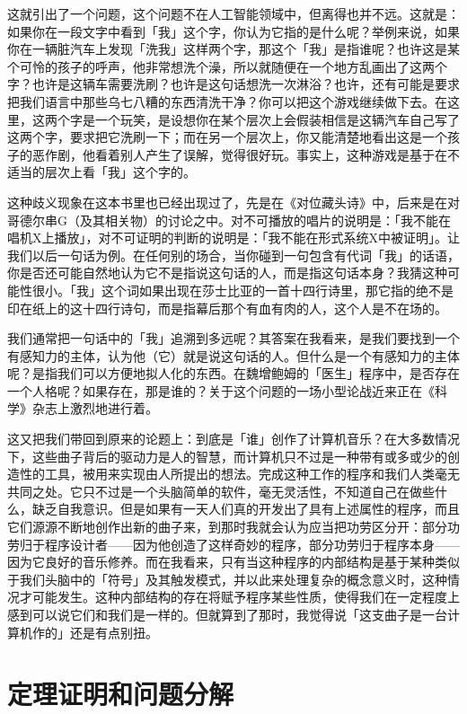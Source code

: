 \documentclass[
  12pt,
  twoside,
  openright,
  oldfontcommands,
]{memoir}
\begin{document}
这就引出了一个问题，这个问题不在人工智能领域中，但离得也并不远。这就是：如果你在一段文字中看到「我」这个字，你认为它指的是什么呢？举例来说，如果你在一辆脏汽车上发现「洗我」这样两个字，那这个「我」是指谁呢？也许这是某个可怜的孩子的呼声，他非常想洗个澡，所以就随便在一个地方乱画出了这两个字？也许是这辆车需要洗刷？也许是这句话想洗一次淋浴？也许，还有可能是要求把我们语言中那些乌七八糟的东西清洗干净？你可以把这个游戏继续做下去。在这里，这两个字是一个玩笑，是设想你在某个层次上会假装相信是这辆汽车自己写了这两个字，要求把它洗刷一下；而在另一个层次上，你又能清楚地看出这是一个孩子的恶作剧，他看着别人产生了误解，觉得很好玩。事实上，这种游戏是基于在不适当的层次上看「我」这个字的。

这种歧义现象在这本书里也已经出现过了，先是在《对位藏头诗》中，后来是在对哥德尔串G（及其相关物）的讨论之中。对不可播放的唱片的说明是：「我不能在唱机X上播放」，对不可证明的判断的说明是：「我不能在形式系统X中被证明」。让我们以后一句话为例。在任何别的场合，当你碰到一句包含有代词「我」的话语，你是否还可能自然地认为它不是指说这句话的人，而是指这句话本身？我猜这种可能性很小。「我」这个词如果出现在莎士比亚的一首十四行诗里，那它指的绝不是印在纸上的这十四行诗句，而是指幕后那个有血有肉的人，这个人是不在场的。

我们通常把一句话中的「我」追溯到多远呢？其答案在我看来，是我们要找到一个有感知力的主体，认为他（它）就是说这句话的人。但什么是一个有感知力的主体呢？是指我们可以方便地拟人化的东西。在魏增鲍姆的「医生」程序中，是否存在一个人格呢？如果存在，那是谁的？关于这个问题的一场小型论战近来正在《科学》杂志上激烈地进行着。

这又把我们带回到原来的论题上：到底是「谁」创作了计算机音乐？在大多数情况下，这些曲子背后的驱动力是人的智慧，而计算机只不过是一种带有或多或少的创造性的工具，被用来实现由人所提出的想法。完成这种工作的程序和我们人类毫无共同之处。它只不过是一个头脑简单的软件，毫无灵活性，不知道自己在做些什么，缺乏自我意识。但是如果有一天人们真的开发出了具有上述属性的程序，而且它们源源不断地创作出新的曲子来，到那时我就会认为应当把功劳区分开：部分功劳归于程序设计者------因为他创造了这样奇妙的程序，部分功劳归于程序本身------因为它良好的音乐修养。而在我看来，只有当这种程序的内部结构是基于某种类似于我们头脑中的「符号」及其触发模式，并以此来处理复杂的概念意义时，这种情况才可能发生。这种内部结构的存在将赋予程序某些性质，使得我们在一定程度上感到可以说它们和我们是一样的。但就算到了那时，我觉得说「这支曲子是一台计算机作的」还是有点别扭。

\section{定理证明和问题分解}
\end{document}
